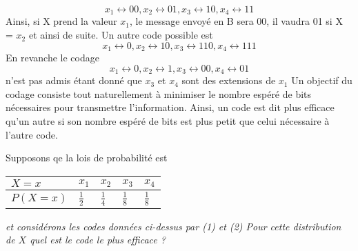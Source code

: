 \begin{exo}
  \setcounter{equation}{0}
  \begin{equation}
    x_1 \leftrightarrow 00,
    x_2 \leftrightarrow 01,
    x_3 \leftrightarrow 10,
    x_4 \leftrightarrow 11
  \end{equation}
  Ainsi, si X prend la valeur $x_1$, le message envoyé en B sera 00,
  il vaudra 01 si X = $x_2$ et ainsi de suite. Un autre code possible est
  \begin{equation}
    x_1 \leftrightarrow 0,
    x_2 \leftrightarrow 10,
    x_3 \leftrightarrow 110,
    x_4 \leftrightarrow 111
  \end{equation}
  En revanche le codage
  \begin{equation}
    x_1 \leftrightarrow 0,
    x_2 \leftrightarrow 1,
    x_3 \leftrightarrow 00,
    x_4 \leftrightarrow 01
  \end{equation}
  n'est pas admis étant donné que $x_3$ et $x_4$ sont des extensions de $x_1$
  Un objectif du codage consiste tout naturellement à minimiser le nombre
  espéré de bits nécessaires pour transmettre l’information.
  Ainsi, un code est dit plus efficace qu’un autre si son nombre espéré
  de bits est plus petit que celui nécessaire à l’autre code.
  \begin{subexo}{Supposons qe la lois de probabilité est}
    \begin{center}
      \begin{tabular}{@{}l|llll@{}}
        $X = x$  & $x_1$         & $x_2$         & $x_3$         & $x_4$         \\ \midrule
        $P(X=x)$ & $\frac{1}{2}$ & $\frac{1}{4}$ & $\frac{1}{8}$ & $\frac{1}{8}$
      \end{tabular}
    \end{center}
    \textit{ et considérons les codes données ci-dessus par (1) et (2)
    Pour cette distribution de $X$ quel est le code le plus efficace ?}

\end{subexo}
\end{exo}
